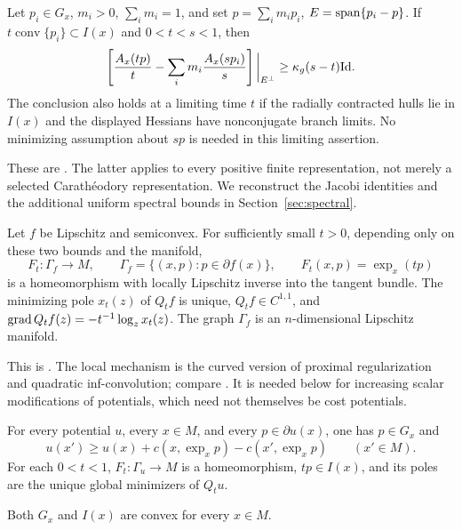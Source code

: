\begin{lemma}\label{geo:slack}
Let $p_i\in G_x$, $m_i>0$, $\sum_i m_i=1$, and set
$p=\sum_i m_ip_i$, $E=\operatorname{span}\{p_i-p\}$. If
$t\operatorname{conv}\{p_i\}\subset I(x)$ and $0<t<s<1$,
then
\[
 \left[\frac{A_x(tp)}t-\sum_i m_i\frac{A_x(sp_i)}s\right]
       \bigg|_{E^\perp}\geq\kappa_g(s-t)\mathrm{Id}.
\]
The conclusion also holds at a limiting time $t$ if the
radially contracted hulls lie in $I(x)$ and the displayed
Hessians have nonconjugate branch limits. No minimizing
assumption about $sp$ is needed in this limiting assertion.
\end{lemma}

These are \cite[Lemmas~4.2--4.3]{Foundation2026}. The latter applies to
every positive finite representation, not merely a selected
Carath\'eodory representation. We reconstruct the Jacobi
identities and the additional uniform spectral bounds in
Section~\ref{sec:spectral}.

\begin{lemma}\label{geo:short-time}
Let $f$ be Lipschitz and semiconvex. For sufficiently small
$t>0$, depending only on these two bounds and the manifold,
\[
 F_t:\Gamma_f\to M,\qquad
 \Gamma_f=\{(x,p):p\in\partial f(x)\},\qquad
 F_t(x,p)=\exp_x(tp)
\]
is a homeomorphism with locally Lipschitz inverse into the
tangent bundle. The minimizing pole $x_t(z)$ of $Q_tf$ is
unique, $Q_tf\in C^{1,1}$, and
$\operatorname{grad} Q_tf(z)=-t^{-1}\log_zx_t(z)$.
The graph $\Gamma_f$ is an $n$-dimensional Lipschitz manifold.
\end{lemma}

This is \cite[Lemma~4.4]{Foundation2026}. The local mechanism is the curved
version of proximal regularization and quadratic
inf-convolution; compare \cite[Sections~3--5 and~7]{Moreau1965}.
It is needed below for increasing scalar modifications of
potentials, which need not themselves be cost potentials.

\begin{theorem}\label{geo:support}
For every potential $u$, every $x\in M$, and every
$p\in\partial u(x)$, one has $p\in G_x$ and
\[
 u(x')\geq u(x)+c(x,\exp_xp)-c(x',\exp_xp)
 \qquad(x'\in M).
\]
For each $0<t<1$, $F_t:\Gamma_u\to M$ is a
homeomorphism, $tp\in I(x)$, and its poles are the unique
global minimizers of $Q_tu$.
\end{theorem}

\begin{corollary}\label{geo:convexity}
Both $G_x$ and $I(x)$ are convex for every $x\in M$.
\end{corollary}


